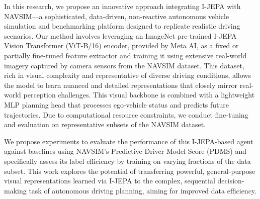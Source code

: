 \documentclass{article}
\begin{document}
In this research, we propose an innovative approach integrating I-JEPA with NAVSIM—a sophisticated, data-driven, non-reactive autonomous vehicle simulation and benchmarking platform designed to replicate realistic driving scenarios. Our method involves leveraging an ImageNet pre-trained I-JEPA Vision Transformer (ViT-B/16) encoder, provided by Meta AI, as a fixed or partially fine-tuned feature extractor and training it using extensive real-world imagery captured by camera sensors from the NAVSIM dataset. This dataset, rich in visual complexity and representative of diverse driving conditions, allows the model to learn nuanced and detailed representations that closely mirror real-world perception challenges. This visual backbone is combined with a lightweight MLP planning head that processes ego-vehicle status and predicts future trajectories. Due to computational resource constraints, we conduct fine-tuning and evaluation on representative subsets of the NAVSIM dataset. 

We propose experiments to evaluate the performance of this I-JEPA-based agent against baselines using NAVSIM's Predictive Driver Model Score (PDMS) and specifically assess its label efficiency by training on varying fractions of the data subset. This work explores the potential of transferring powerful, general-purpose visual representations learned via I-JEPA to the complex, sequential decision-making task of autonomous driving planning, aiming for improved data efficiency.


\end{document}
